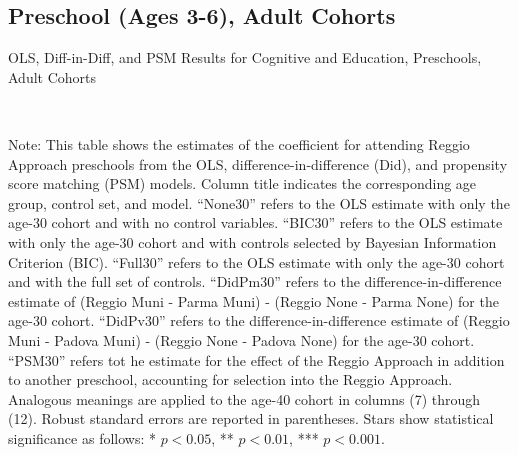 \begin{landscape}
\subsection{Preschool (Ages 3-6), Adult Cohorts}

\begin{table}[H] \caption{OLS, Diff-in-Diff, and PSM Results for Cognitive and Education, Preschools, Adult Cohorts} \label{ols-E-reg}
\scalebox{0.80}{}
\vspace{1ex} \\
\footnotesize\raggedright{Note: This table shows the estimates of the coefficient for attending Reggio Approach preschools from the OLS, difference-in-difference (Did), and propensity score matching (PSM) models. Column title indicates the corresponding age group, control set, and model. ``None30'' refers to the OLS estimate with only the age-30 cohort and with no control variables. ``BIC30'' refers to the OLS estimate with only the age-30 cohort and with controls selected by Bayesian Information Criterion (BIC). ``Full30'' refers to the OLS estimate with only the age-30 cohort and with the full set of controls. ``DidPm30'' refers to the difference-in-difference estimate of (Reggio Muni - Parma Muni) - (Reggio None - Parma None) for the age-30 cohort. ``DidPv30'' refers to the difference-in-difference estimate of (Reggio Muni - Padova Muni) - (Reggio None - Padova None) for the age-30 cohort. ``PSM30'' refers tot he estimate for the effect of the Reggio Approach in addition to another preschool, accounting for selection into the Reggio Approach. Analogous meanings are applied to the age-40 cohort in columns (7) through (12). Robust standard errors are reported in parentheses. Stars show statistical significance as follows: * $p < 0.05$, ** $p < 0.01$, *** $p < 0.001$.}
\end{table}



\end{landscape}
